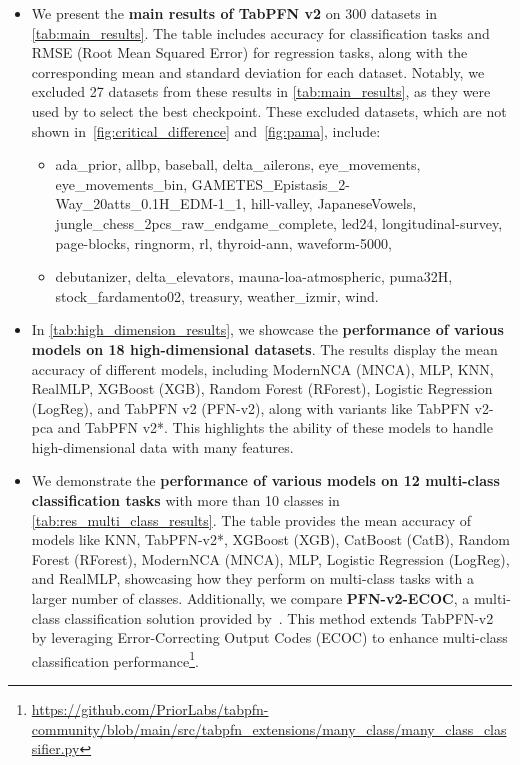 \begin{itemize}
    \item We present the \textbf{main results of TabPFN v2} on 300 datasets in \autoref{tab:main_results}. The table includes accuracy for classification tasks and RMSE (Root Mean Squared Error) for regression tasks, along with the corresponding mean and standard deviation for each dataset. Notably, we excluded 27 datasets from these results in \autoref{tab:main_results}, as they were used by \ours to select the best checkpoint. These excluded datasets, which are not shown in~\autoref{fig:critical_difference} and~\autoref{fig:pama}, include:  
    \begin{itemize}
        \item[(1)] ada\_prior, allbp, baseball, delta\_ailerons, eye\_movements, eye\_movements\_bin, GAMETES\_Epistasis\_2-Way\_20atts\_0.1H\_EDM-1\_1, hill-valley, JapaneseVowels, jungle\_chess\_2pcs\_raw\_endgame\_complete, led24, longitudinal-survey, page-blocks, ringnorm, rl, thyroid-ann, waveform-5000,  
        \item[(2)] debutanizer, delta\_elevators, mauna-loa-atmospheric, puma32H, stock\_fardamento02, treasury, weather\_izmir, wind.
    \end{itemize}

    \item In \autoref{tab:high_dimension_results}, we showcase the \textbf{performance of various models on 18 high-dimensional datasets}. The results display the mean accuracy of different models, including ModernNCA (MNCA), MLP, KNN, RealMLP, XGBoost (XGB), Random Forest (RForest), Logistic Regression (LogReg), and TabPFN v2 (PFN-v2), along with variants like TabPFN v2-pca and TabPFN v2*. This highlights the ability of these models to handle high-dimensional data with many features.

    \item We demonstrate the \textbf{performance of various models on 12 multi-class classification tasks} with more than 10 classes in \autoref{tab:res_multi_class_results}. The table provides the mean accuracy of models like KNN, TabPFN-v2*, XGBoost (XGB), CatBoost (CatB), Random Forest (RForest), ModernNCA (MNCA), MLP, Logistic Regression (LogReg), and RealMLP, showcasing how they perform on multi-class tasks with a larger number of classes. Additionally, we compare \textbf{PFN-v2-ECOC}, a multi-class classification solution provided by~\citet{hollmann2025TabPFNv2}. This method extends TabPFN-v2 by leveraging Error-Correcting Output Codes (ECOC) to enhance multi-class classification performance\footnote{\href{https://github.com/PriorLabs/tabpfn-community/blob/main/src/tabpfn_extensions/many_class/many_class_classifier.py}{https://github.com/PriorLabs/tabpfn-community/blob/main/src/tabpfn\_extensions/many\_class/many\_class\_classifier.py}}. 


\end{itemize}
